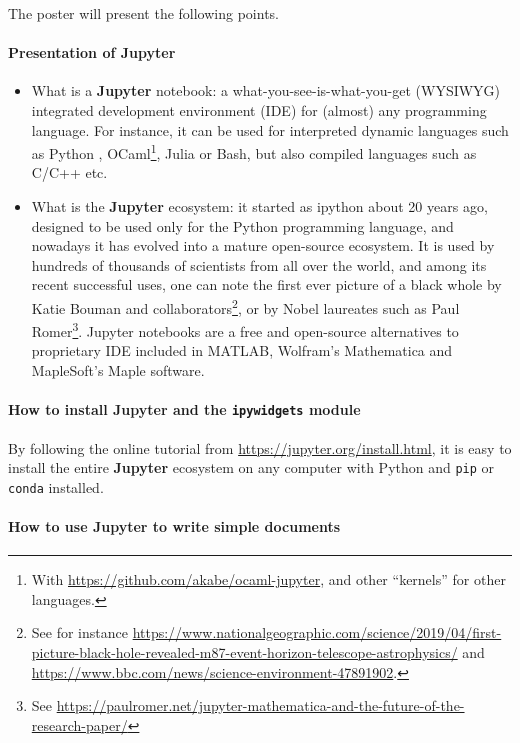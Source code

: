 \documentclass[runningheads]{llncs}
\newcommand{\Jupyter}{\textbf{Jupyter}}
\begin{document}
The poster will present the following points.

\paragraph{Presentation of \Jupyter}

\begin{itemize}
    \item What is a \Jupyter{} notebook: a what-you-see-is-what-you-get (WYSIWYG) integrated development environment (IDE) for (almost) any programming language. For instance, it can be used for interpreted dynamic languages such as Python \cite{python}, OCaml\footnote{With \url{https://github.com/akabe/ocaml-jupyter}, and other ``kernels'' for other languages.}, Julia or Bash, but also compiled languages such as C/C++ etc.

    \item What is the \Jupyter{} ecosystem: it started as ipython \cite{ipython} about 20 years ago, designed to be used only for the Python programming language, and nowadays it has evolved into a mature open-source ecosystem.
    It is used by hundreds of thousands of scientists from all over the world, and among its recent successful uses, one can note the first ever picture of a black whole by Katie Bouman and collaborators\footnote{See for instance \url{https://www.nationalgeographic.com/science/2019/04/first-picture-black-hole-revealed-m87-event-horizon-telescope-astrophysics/} and \url{https://www.bbc.com/news/science-environment-47891902}.}, or by Nobel laureates such as Paul Romer\footnote{See \url{https://paulromer.net/jupyter-mathematica-and-the-future-of-the-research-paper/}}.
    Jupyter notebooks are a free and open-source alternatives to proprietary IDE included in MATLAB, Wolfram's Mathematica and MapleSoft's Maple software.
\end{itemize}

\paragraph{How to install \Jupyter{} and the \texttt{ipywidgets} module}

By following the online tutorial from \url{https://jupyter.org/install.html}, it is easy to install the entire \Jupyter{} ecosystem on any computer with Python and \texttt{pip} or \texttt{conda} installed.


\paragraph{How to use \Jupyter{} to write simple documents}
\end{document}
